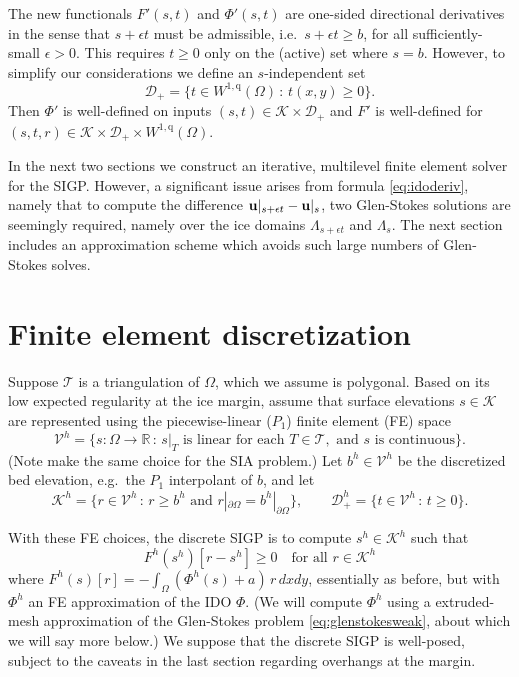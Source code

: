 \documentclass[letterpaper,final,12pt,reqno]{amsart}
\theoremstyle{claim}
\newcommand{\eps}{\epsilon}
\newcommand{\RR}{\mathbb{R}}
\newcommand{\bu}{\mathbf{u}}
\newcommand{\qq}{{\text{q}}}
\numberwithin{equation}{section}
\numberwithin{figure}{section}
\numberwithin{table}{section}
\numberwithin{theorem}{section}
\begin{document}
The new functionals $F'(s,t)$ and $\Phi'(s,t)$ are one-sided directional derivatives in the sense that $s+\eps t$ must be admissible, i.e.~$s+\eps t\ge b$, for all sufficiently-small $\eps>0$.  This requires $t\ge 0$ only on the (active) set where $s=b$.  However, to simplify our considerations we define an $s$-independent set
\begin{equation}
\mathcal{D}_+ = \{t \in W^{1,\qq}(\Omega) \,:\, t(x,y) \ge 0\}. \label{eq:infdefectset}
\end{equation}
Then $\Phi'$ is well-defined on inputs $(s,t) \in \mathcal{K} \times \mathcal{D}_+$ and $F'$ is well-defined for $(s,t,r) \in \mathcal{K} \times \mathcal{D}_+ \times W^{1,\qq}(\Omega)$.

In the next two sections we construct an iterative, multilevel finite element solver for the SIGP.  However, a significant issue arises from formula \eqref{eq:idoderiv}, namely that to compute the difference $\bu|_{s+\eps t} - \bus$, two Glen-Stokes solutions are seemingly required, namely over the ice domains $\Lambda_{s+\eps t}$ and $\Lambda_s$.  The next section includes an approximation scheme which avoids such large numbers of Glen-Stokes solves.


\section{Finite element discretization} \label{sec:fe}

Suppose $\mathcal{T}$ is a triangulation of $\Omega$, which we assume is polygonal.  Based on its low expected regularity at the ice margin, assume that surface elevations $s\in \mathcal{K}$ are represented using the piecewise-linear ($P_1$) finite element (FE) space \cite{Elmanetal2014}
\begin{equation}
\mathcal{V}^h = \{s:\Omega \to \RR \,:\, s|_T \text{ is linear for each } T \in \mathcal{T}, \text{ and $s$ is continuous}\}. \label{eq:feP1}
\end{equation}
(Note \cite{JouvetBueler2012} make the same choice for the SIA problem.)  Let $b^h \in \mathcal{V}^h$ be the discretized bed elevation, e.g.~the $P_1$ interpolant of $b$, and let
\begin{equation}
\mathcal{K}^h = \{r \in \mathcal{V}^h \,:\, r \ge b^h \text{ and } r|_{\partial\Omega} = b^h|_{\partial\Omega}\}, \qquad \mathcal{D}_+^h = \{t \in \mathcal{V}^h \,:\, t \ge 0\}. \label{eq:feKD}
\end{equation}

With these FE choices, the discrete SIGP is to compute $s^h \in \mathcal{K}^h$ such that
\begin{equation}
F^h(s^h)[r - s^h] \ge 0 \quad \text{for all } r \in \mathcal{K}^h  \label{eq:fesigpweakform}
\end{equation}
where $F^h(s)[r] = - \int_\Omega (\Phi^h(s) + a)\, r \,dx dy$, essentially as before, but with $\Phi^h$ an FE approximation of the IDO $\Phi$.  (We will compute $\Phi^h$ using a extruded-mesh approximation of the Glen-Stokes problem \eqref{eq:glenstokesweak}, about which we will say more below.)  We suppose that the discrete SIGP is well-posed, subject to the caveats in the last section regarding overhangs at the margin.
\end{document}
